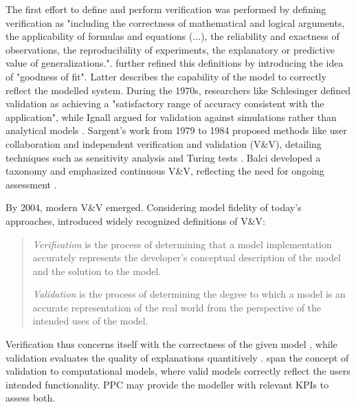 The first effort to define and perform verification was performed by \autocite{machlup1955problem} defining verification as "including the correctness of mathematical and logical arguments, the applicability of formulas and equations (...), the reliability and exactness of observations, the reproducibility of experiments, the explanatory or predictive value of generalizations.". \Autocite{naylor1967verification} further refined this definitions by introducing the idea of "goodness of fit". Latter describes the capability of the model to correctly reflect the modelled system. During the 1970s, researchers like Schlesinger \autocite{schlesinger1979terminology} defined validation as achieving a "satisfactory range of accuracy consistent with the application", while Ignall argued for validation against simulations rather than analytical models \autocite{ignall1978using}. Sargent's work from 1979 to 1984 proposed methods like user collaboration and independent verification and validation (V&V), detailing techniques such as sensitivity analysis and Turing tests \autocite{Sargent2010wsc}. Balci developed a taxonomy and emphasized continuous V&V, reflecting the need for ongoing assessment \autocite{balci2012life}.

By 2004, modern V&V emerged. Considering model fidelity of today's approaches, \autocite{Oberkampf2004amr} introduced widely recognized definitions of V&V:

\begin{quote}
  \textit{Verification} is the process of determining that a model implementation accurately represents the developer's conceptual description of the model and the solution to the model.

  \textit{Validation} is the process of determining the degree to which a model is an accurate representation of the real world from the perspective of the intended uses of the model. \autocite{Oberkampf2004amr}
\end{quote}

Verification thus concerns itself with the correctness of the given model \autocite{Sargent2010wsc}, while validation evaluates the quality of explanations quantitively \autocite{Oberkampf2004amr}.  span the concept of validation to computational models, where valid models correctly reflect the users intended functionality. PPC may provide the modeller with relevant KPIs to assess both.

